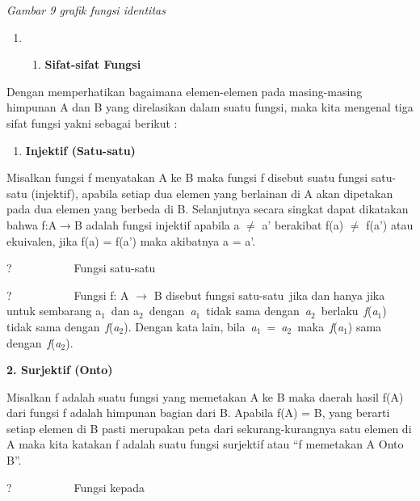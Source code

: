\documentclass[11pt,fleqn]{book} %
\begin{document}
\textit{Gambar 9 grafik fungsi identitas}

\noindent 

\begin{enumerate}
\item \begin{enumerate}
\item  \textbf{Sifat-sifat Fungsi}
\end{enumerate}
\end{enumerate}

Dengan memperhatikan bagaimana elemen-elemen pada masing-masing himpunan A dan B yang direlasikan dalam suatu fungsi, maka kita mengenal tiga sifat fungsi yakni sebagai berikut :



\begin{enumerate}
\item  \textbf{Injektif (Satu-satu)}
\end{enumerate}

\noindent 

\noindent Misalkan fungsi f menyatakan A ke B maka fungsi f disebut suatu fungsi satu-satu (injektif), apabila setiap dua elemen yang berlainan di A akan dipetakan pada dua elemen yang berbeda di B. Selanjutnya secara singkat dapat dikatakan bahwa f:A$\mathrm{\to}$B adalah fungsi injektif apabila a $\mathrm{\neq}$ a' berakibat f(a) $\mathrm{\neq}$ f(a') atau ekuivalen, jika f(a) = f(a') maka akibatnya a = a'.

\noindent 

\noindent ?~~~~~~~~~~~Fungsi satu-satu

\noindent ?~~~~~~~~~~~Fungsi f: A $\mathrm{\to}$ B disebut fungsi satu-satu~jika dan hanya jika untuk sembarang a${}_{1}$~dan a${}_{2}$~dengan~\textit{a${}_{1}$}~tidak sama dengan~\textit{a${}_{2}$}~berlaku~\textit{f}(\textit{a${}_{1}$}) tidak sama dengan~\textit{f}(\textit{a${}_{2}$}). Dengan kata lain, bila~\textit{a${}_{1}$}~=~\textit{a${}_{2}$}~maka~\textit{f}(\textit{a${}_{1}$}) sama dengan~\textit{f}(\textit{a${}_{2}$}).

\noindent \textbf{2.   Surjektif (Onto)}

\noindent Misalkan f adalah suatu fungsi yang memetakan A ke B maka daerah hasil f(A) dari fungsi f adalah himpunan bagian dari B. Apabila f(A) = B, yang berarti setiap elemen di B pasti merupakan peta dari sekurang-kurangnya satu elemen di A maka kita katakan f adalah suatu fungsi surjektif atau ``f memetakan A Onto B''.

\noindent ?~~~~~~~~~~~Fungsi kepada
\end{document}
